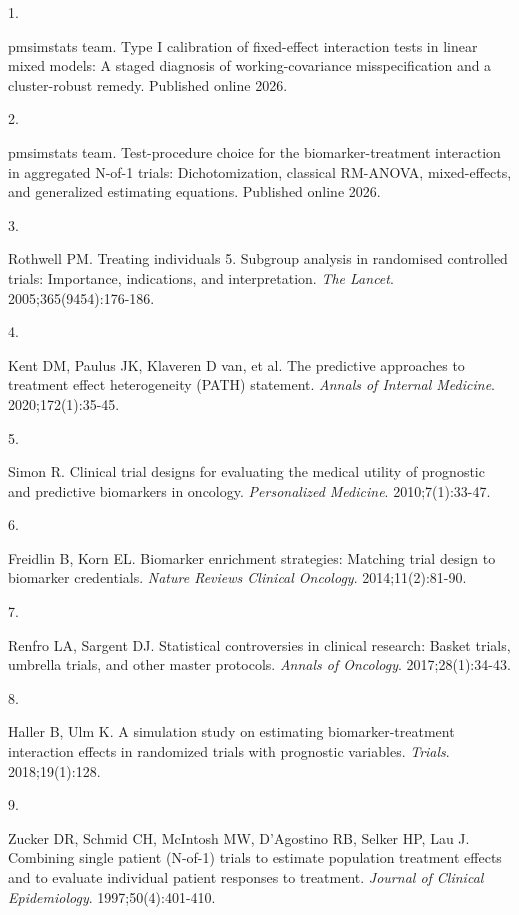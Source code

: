 \documentclass[
  11pt,
]{article}
\newlength{\cslhangindent}
\newlength{\csllabelwidth}
\newenvironment{CSLReferences}[2] %
 {\begin{list}{}{%
  \setlength{\itemindent}{0pt}
  \setlength{\leftmargin}{0pt}
  \setlength{\parsep}{0pt}
  \ifodd #1
   \setlength{\leftmargin}{\cslhangindent}
   \setlength{\itemindent}{-1\cslhangindent}
  \fi
  \setlength{\itemsep}{#2\baselineskip}}}
 {\end{list}}
\newcommand{\CSLLeftMargin}[1]{\parbox[t]{\csllabelwidth}{\strut#1\strut}}
\newcommand{\CSLRightInline}[1]{\parbox[t]{\linewidth - \csllabelwidth}{\strut#1\strut}}
\begin{document}
\protect{}\label{refs}
\begin{CSLReferences}{0}{1}
\CSLLeftMargin{1. }%
\CSLRightInline{{pmsimstats team}. Type {I} calibration of fixed-effect
interaction tests in linear mixed models: A staged diagnosis of
working-covariance misspecification and a cluster-robust remedy.
Published online 2026.}

\CSLLeftMargin{2. }%
\CSLRightInline{{pmsimstats team}. Test-procedure choice for the
biomarker-treatment interaction in aggregated {N}-of-1 trials:
Dichotomization, classical {RM-ANOVA}, mixed-effects, and generalized
estimating equations. Published online 2026.}

\CSLLeftMargin{3. }%
\CSLRightInline{Rothwell PM. Treating individuals 5. Subgroup analysis
in randomised controlled trials: Importance, indications, and
interpretation. \emph{The Lancet}. 2005;365(9454):176-186.}

\CSLLeftMargin{4. }%
\CSLRightInline{{Kent DM, Paulus JK, Klaveren D van, et al.} The
predictive approaches to treatment effect heterogeneity ({PATH})
statement. \emph{Annals of Internal Medicine}. 2020;172(1):35-45.}

\CSLLeftMargin{5. }%
\CSLRightInline{Simon R. Clinical trial designs for evaluating the
medical utility of prognostic and predictive biomarkers in oncology.
\emph{Personalized Medicine}. 2010;7(1):33-47.}

\CSLLeftMargin{6. }%
\CSLRightInline{Freidlin B, Korn EL. Biomarker enrichment strategies:
Matching trial design to biomarker credentials. \emph{Nature Reviews
Clinical Oncology}. 2014;11(2):81-90.}

\CSLLeftMargin{7. }%
\CSLRightInline{Renfro LA, Sargent DJ. Statistical controversies in
clinical research: Basket trials, umbrella trials, and other master
protocols. \emph{Annals of Oncology}. 2017;28(1):34-43.}

\CSLLeftMargin{8. }%
\CSLRightInline{Haller B, Ulm K. A simulation study on estimating
biomarker-treatment interaction effects in randomized trials with
prognostic variables. \emph{Trials}. 2018;19(1):128.}

\CSLLeftMargin{9. }%
\CSLRightInline{Zucker DR, Schmid CH, McIntosh MW, D'Agostino RB, Selker
HP, Lau J. Combining single patient ({N}-of-1) trials to estimate
population treatment effects and to evaluate individual patient
responses to treatment. \emph{Journal of Clinical Epidemiology}.
1997;50(4):401-410.}


\end{CSLReferences}
\end{document}

